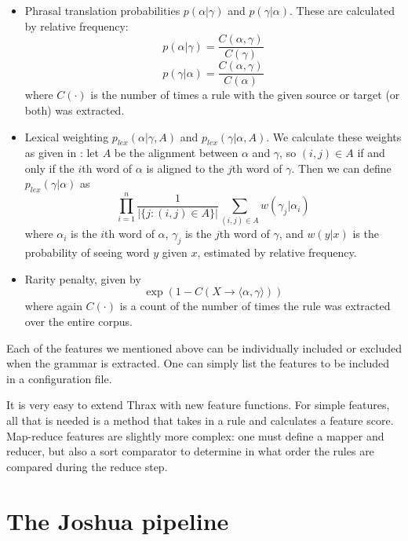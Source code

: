 \documentclass[11pt]{article}
\begin{document}
\begin{itemize}
\item Phrasal translation probabilities $p(\alpha|\gamma)$ and $p(\gamma|\alpha)$. These are calculated by relative frequency:
\begin{equation}
p(\alpha|\gamma) = \frac{C(\alpha,\gamma)}{C(\gamma)}
\end{equation}
\begin{equation}
p(\gamma|\alpha) = \frac{C(\alpha,\gamma)}{C(\alpha)}
\end{equation}
where $C(\cdot)$ is the number of times a rule with the given source or target (or both) was extracted.
\item Lexical weighting $p_{\textit{lex}}(\alpha|\gamma,A)$ and $p_{\textit{lex}}(\gamma|\alpha,A)$. We calculate these weights as given in \cite{koehn2003}: let $A$ be the alignment between $\alpha$ and $\gamma$, so $(i,j) \in A$ if and only if the $i$th word of $\alpha$ is aligned to the $j$th word of $\gamma$. Then we can define $p_{\textit{lex}}(\gamma|\alpha)$ as
\begin{equation}
\prod_{i=1}^n{\frac{1}{|\{j : (i,j) \in A\}|}\sum_{(i,j) \in A}{w(\gamma_j|\alpha_i)}}
\end{equation}
where $\alpha_i$ is the $i$th word of $\alpha$, $\gamma_j$ is the $j$th word of $\gamma$, and $w(y|x)$ is the probability of seeing word $y$ given $x$, estimated by relative frequency.
\item Rarity penalty, given by
\begin{equation}
\exp(1 - C(X \to \langle \alpha , \gamma \rangle))
\end{equation}
where again $C(\cdot)$ is a count of the number of times the rule was extracted over the entire corpus.
\end{itemize}

Each of the features we mentioned above can be individually included or excluded when the grammar is extracted. One can simply list the features to be included in a configuration file.

It is very easy to extend Thrax with new feature functions. For simple features, all that is needed is a method that takes in a rule and calculates a feature score. Map-reduce features are slightly more complex: one must define a mapper and reducer, but also a sort comparator to determine in what order the rules are compared during the reduce step.


\section{The Joshua pipeline}
\end{document}

